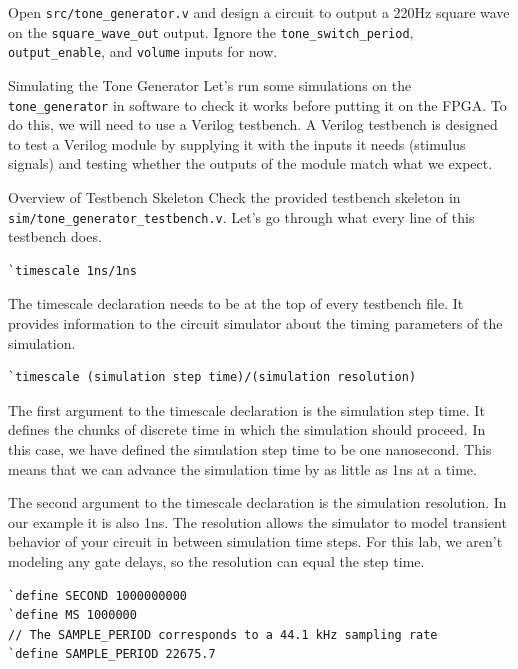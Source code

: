 \documentclass[11pt]{article}
\makeatletter
\renewcommand{\section}
{\@startsection {section}{1}{0pt}
 {-2ex}
 {1ex}
 {\bfseries\Large}}
\renewcommand{\subsection}
{\@startsection {subsection}{1}{0pt}
 {-1ex}
 {0.5ex}
 {\bfseries\normalsize}}
\makeatother
\begin{document}
Open \verb|src/tone_generator.v| and design a circuit to output a 220Hz square wave on the \verb|square_wave_out| output.
Ignore the \verb|tone_switch_period|, \verb|output_enable|, and \verb|volume| inputs for now.

\section{Simulating the Tone Generator}
Let's run some simulations on the \verb|tone_generator| in software to check it works before putting it on the FPGA.
To do this, we will need to use a Verilog testbench.
A Verilog testbench is designed to test a Verilog module by supplying it with the inputs it needs (stimulus signals) and testing whether the outputs of the module match what we expect.

\subsection{Overview of Testbench Skeleton}
Check the provided testbench skeleton in \verb|sim/tone_generator_testbench.v|.
Let's go through what every line of this testbench does.

\begin{verbatim}
`timescale 1ns/1ns
\end{verbatim}

The timescale declaration needs to be at the top of every testbench file. It provides information to the circuit simulator about the timing parameters of the simulation.
\begin{verbatim}
`timescale (simulation step time)/(simulation resolution)
\end{verbatim}

The first argument to the timescale declaration is the simulation step time. It defines the chunks of discrete time in which the simulation should proceed. In this case, we have defined the simulation step time to be one nanosecond. This means that we can advance the simulation time by as little as 1ns at a time.

The second argument to the timescale declaration is the simulation resolution. In our example it is also 1ns. The resolution allows the simulator to model transient behavior of your circuit in between simulation time steps. For this lab, we aren't modeling any gate delays, so the resolution can equal the step time.

\begin{verbatim}
`define SECOND 1000000000
`define MS 1000000
// The SAMPLE_PERIOD corresponds to a 44.1 kHz sampling rate
`define SAMPLE_PERIOD 22675.7
\end{verbatim}
\end{document}
